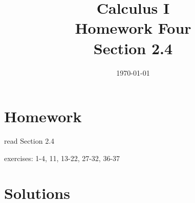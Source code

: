 \documentclass[letterpaper, landscape]{exam}
\title{Calculus I \\ Homework Four \\ Section 2.4}
\author{}
\date{\today}
\begin{document}
  \maketitle

  \section{Homework}
    \begin{itemize*}
      \item read Section 2.4
      \item exercises: 1-4, 11, 13-22, 27-32, 36-37
    \end{itemize*}

  \ifprintanswers

    \section{Solutions}
\end{document}
